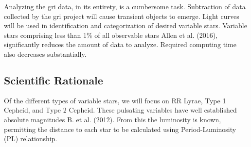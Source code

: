 \documentclass[letterpaper,11pt]{article}
\begin{document}
Analyzing the gri data, in its entirety, is a cumbersome task.  Subtraction of data collected by the gri project will cause transient objects to emerge.  
Light curves will be used in identification and categorization of desired variable stars.
Variable stars comprising less than 1\% of all observable stars Allen et al. (2016), significantly reduces the amount of data to analyze.  Required computing time also decreases substantially.


\subsection{Scientific Rationale}
Of the different types of variable stars, we will focus on RR Lyrae, Type 1 Cepheid, and Type 2 Cepheid.  These pulsating variables have well established absolute magnitudes B. et al. (2012).  From this the luminosity is known, permitting the distance to each star to be calculated using Period-Luminosity (PL) relationship.
\end{document}
